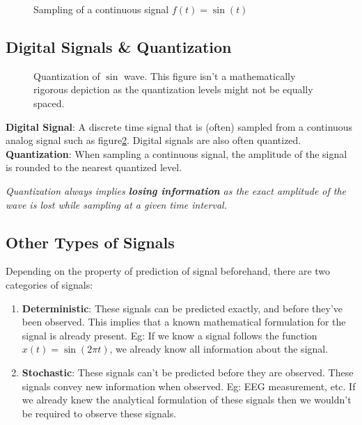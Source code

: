 \documentclass[letterpaper,12pt]{article}
\begin{document}
\begin{figure}
    \centering
    \caption{Sampling of a continuous signal $f(t) = \sin(t)$}\label{fig:sampling_signal}
\end{figure}

\subsection{Digital Signals \& Quantization}

\begin{figure}[!ht]
    \centering
    \caption{Quantization of $\sin$ wave. This figure isn't a mathematically rigorous depiction as the quantization levels might not be equally spaced.}\label{fig:sampling_signal_quantized}
\end{figure}

\textbf{Digital Signal}: A discrete time signal that is (often) sampled from a continuous analog signal such as figure\ref{fig:sampling_signal_quantized}. Digital signals are also often quantized. \\
\textbf{Quantization}: When sampling a continuous signal, the amplitude of the signal is rounded to the nearest quantized level.

\textit{Quantization always implies \textbf{losing information} as the exact amplitude of the wave is lost while sampling at a given time interval.}

\subsection{Other Types of Signals}
Depending on the property of prediction of signal beforehand, there are two
categories of signals:
\begin{enumerate}
    \item \textbf{Deterministic}: These signals can be predicted exactly, and before they've been observed. This implies that a known mathematical formulation for the signal is already present. Eg: If we know a signal follows the function \(x(t) = \sin(2{\pi}t)\), we already know all information about the signal.
    \item \textbf{Stochastic}: These signals can't be predicted before they are observed. These signals convey new information when observed.  Eg: EEG measurement, etc. If we already knew the analytical formulation of these signals then we wouldn't be required to observe these signals.
\end{enumerate}
\end{document}
